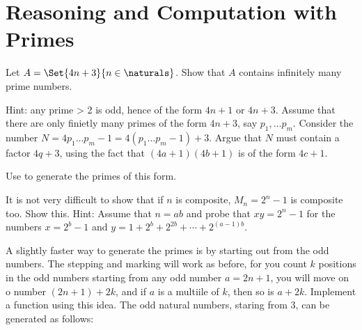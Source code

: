 \documentclass{report}
\newcommand{\Conid}[1]{\mathit{#1}}
\newcommand{\Varid}[1]{\mathit{#1}}
\def\resethooks{%
  \global\let\SaveRestoreHook\empty
  \global\let\ColumnHook\empty}
\let\hspre\empty
\let\hspost\empty
\begin{document}
\section{Reasoning and Computation with Primes}

\begin{Exercise} [number=34]
    \ExePart Let $A = \Set{4n + 3}{n \in \naturals}$. Show that $A$ contains infinitely many prime numbers.
    
    \ExeText Hint: any prime > 2 is odd, hence of the form $4n + 1$ or $4n + 3$. Assume that there are only finietly many primes of the form $4n + 3$, say $p_1, \dots p_m$. Consider the number $N = 4p_1 \dots p_m - 1 = 4(p_1 \dots p_m - 1) + 3$. Argue that $N$ must contain a factor $4q + 3$, using the fact that $(4a + 1)(4b + 1)$ is of the form $4c + 1$.
    
    \ExePart Use  to generate the primes of this form.
\end{Exercise}

\begin{Exercise} [number=36]
    It is not very difficult to show that if $n$ is composite, $M_n = 2^n - 1$ is composite too. Show this.
    \ExeText Hint: Assume that $n = ab$ and probe that $xy = 2^n - 1$ for the numbers $x = 2^b - 1$ and $y = 1 + 2^b + 2^{2b} + \cdots + 2^{(a-1)b}$.
\end{Exercise}

\begin{Exercise} [number=38]
A slightly faster way to generate the primes is by starting out from the odd numbers. The stepping and marking will work as before, for you count $k$ positions in the odd numbers starting from any odd number $a = 2n + 1$, you will move on o number $(2n + 1) + 2k$, and if $a$ is a multiile of $k$, then so is $a + 2k$. Implement a function  using this idea. The odd natural numbers, staring from 3, can be generated as follows:
\resethooks
\end{Exercise}
\end{document}
